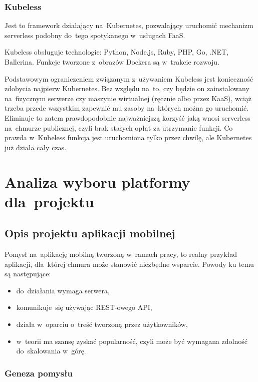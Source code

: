 \documentclass[12pt,a4paper,twoside,titlepage,openright]{book}
\begin{document}
\subsection{Kubeless}

Jest to framework działający na~Kubernetes, pozwalający uruchomić mechanizm serverless podobny do~tego spotykanego w~usługach FaaS. \cite{distributedSystems} 

Kubeless obsługuje technologie: Python, Node.js, Ruby, PHP, Go, .NET, Ballerina. Funkcje tworzone z~obrazów Dockera są w~trakcie rozwoju.

Podstawowym ograniczeniem związanym z~używaniem Kubeless jest konieczność zdobycia najpierw Kubernetes. Bez względu na~to, czy będzie on zainstalowany na~fizycznym serwerze czy maszynie wirtualnej (ręcznie albo przez KaaS), wciąż trzeba przede wszystkim zapewnić mu zasoby na~których można go uruchomić. Eliminuje to zatem prawdopodobnie najważniejszą korzyść jaką wnosi serverless na~chmurze publicznej, czyli brak stałych opłat za utrzymanie funkcji. Co prawda w~Kubeless funkcja jest uruchomiona tylko przez chwilę, ale Kubernetes już działa cały czas.


\chapter{Analiza wyboru platformy dla~projektu}

\section{Opis projektu aplikacji mobilnej}

Pomysł na~aplikację mobilną tworzoną w~ramach pracy, to realny przykład aplikacji, dla~której chmura może stanowić niezbędne wsparcie. Powody ku temu są następujące:
\begin{itemize}
\item do~działania wymaga serwera,
\item komunikuje~się używając REST-owego API,
\item działa w~oparciu o~treść tworzoną przez użytkowników,
\item w~teorii ma szansę zyskać popularność, czyli może być wymagana zdolność do~skalowania w~górę.
\end{itemize}

\subsection{Geneza pomysłu}\label{section:genezaPomyslu}
\end{document}
